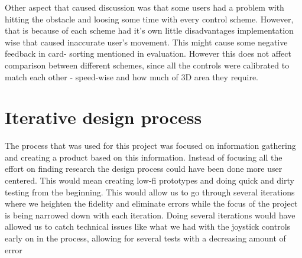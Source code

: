 Other aspect that caused discussion was that some users had a problem with hitting the obstacle and loosing some time with every control scheme. However, that is because of each scheme had it’s own little disadvantages implementation wise that caused inaccurate user’s movement. 
This might cause some negative feedback in card- sorting mentioned in evaluation. However this does not affect comparison between different schemes, since all the controls were calibrated to match each other - speed-wise and how much of 3D area they require. 

\section*{Iterative design process}
The process that was used for this project was focused on information gathering and creating a product based on this information.
Instead of focusing all the effort on finding research the design process could have been done more user centered.
This would mean creating low-fi prototypes and doing quick and dirty testing from the beginning. This would allow us to go through several iterations where we heighten the fidelity and eliminate errors while the focus of the project is being narrowed down with each iteration. Doing several iterations would have allowed us to catch technical issues like what we had with the joystick controls early on in the process, allowing for several tests with a decreasing amount of error
